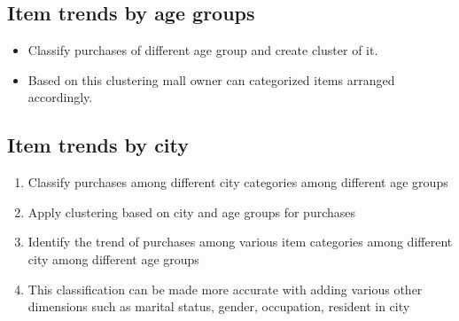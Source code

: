\documentclass[paper=letter, fontsize=12pt]{article}
\begin{document}
\subsection{Item trends by age groups}
\begin{itemize}
	\item Classify purchases of different age group and create cluster of it.
	\item[] Based on this clustering mall owner can categorized items arranged accordingly. 
\end{itemize}

\subsection{Item trends by city}
\begin{enumerate}
	\item Classify purchases among different city categories among different age groups
	\item Apply clustering based on city and age groups for purchases 
	\item Identify the trend of purchases among various item categories among different city among different age groups
	\item[] This classification can be made more accurate with adding various other dimensions such as marital status, gender, occupation, resident in city
\end{enumerate}
\end{document}
